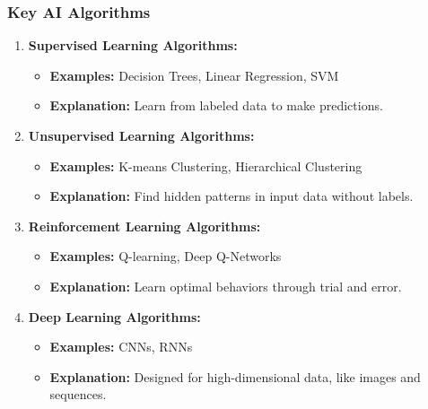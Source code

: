 \documentclass[aspectratio=169]{beamer}
\begin{document}
\begin{frame}[fragile]
    \frametitle{Key AI Algorithms}
    
    \begin{enumerate}
        \item \textbf{Supervised Learning Algorithms:}
            \begin{itemize}
                \item \textbf{Examples:} Decision Trees, Linear Regression, SVM
                \item \textbf{Explanation:} Learn from labeled data to make predictions.
            \end{itemize}

        \item \textbf{Unsupervised Learning Algorithms:}
            \begin{itemize}
                \item \textbf{Examples:} K-means Clustering, Hierarchical Clustering
                \item \textbf{Explanation:} Find hidden patterns in input data without labels.
            \end{itemize}
            
        \item \textbf{Reinforcement Learning Algorithms:}
            \begin{itemize}
                \item \textbf{Examples:} Q-learning, Deep Q-Networks
                \item \textbf{Explanation:} Learn optimal behaviors through trial and error.
            \end{itemize}

        \item \textbf{Deep Learning Algorithms:}
            \begin{itemize}
                \item \textbf{Examples:} CNNs, RNNs
                \item \textbf{Explanation:} Designed for high-dimensional data, like images and sequences.
            \end{itemize}
    \end{enumerate}
\end{frame}
\end{document}
